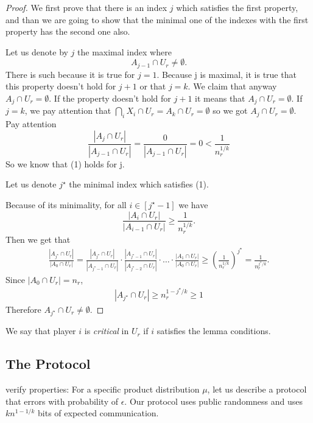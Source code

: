 \documentclass{article}
\newcommand{\TODO}[1]{ {\color{red} #1 }}
\theoremstyle{plain}
\begin{document}
\begin{proof}
    We first prove that there is an index $j$ which satisfies the first property, and than we are going to show that the minimal one of the indexes with the first property has the second one also.

  Let us denote by $j$ the maximal index where 
  \begin{equation*}
    A_{j-1} \cap U_r \neq \emptyset.
  \end{equation*}
  There is such because it is true for $j=1$. \newline
  Because j is maximal, it is true that this property doesn't hold for $j+1$ or that $j=k$. We claim that anyway $A_j  \cap U_r = \emptyset$.
  If the property doesn't hold for $j+1$ it means that $A_j \cap U_r = \emptyset$.
  If $j=k$, we pay attention that $\bigcap_i X_i  \cap U_r = A_k  \cap U_r = \emptyset$ so we got $A_j \cap U_r = \emptyset$. 
  Pay attention
  \begin{equation*}
    \frac{|A_j \cap U_r|}{|A_{j-1} \cap U_r|} = \frac{0}{|A_{j-1} \cap U_r|} = 0 < \frac{1}{n_r^{1/k}}
  \end{equation*}
  So we know that (1) holds for j.
  
  Let us denote $j^\star$ the minimal index which satisfies (1).
  
  Because of its minimality, for all $i \in [j^\star-1]$ we have
  \begin{equation*}
    \frac{|A_i \cap U_r|}{|A_{i-1} \cap U_r|} \geq \frac{1}{n_r^{1/k}}.
  \end{equation*}
  Then we get that
  \begin{align*}
    \frac{|A_{j^\star} \cap U_r|}{|A_0 \cap U_r|} = 
    \frac{|A_{j^\star} \cap U_r|}{|A_{j^\star-1} \cap U_r|} \cdot \frac{|A_{j^\star-1} \cap U_r|}{|A_{j^\star-2} \cap U_r|} \cdot \ldots \cdot \frac{|A_1 \cap U_r|}{|A_0 \cap U_r|}
    \geq
    \left(  \frac{1}{n_r^{1/k}} \right)^{j^\star}
    =
    \frac{1}{n_r^{j^\star/k}}.
  \end{align*}
  Since $|A_0 \cap U_r| = n_r$, 
  \begin{align*}
      |A_{j^\star} \cap U_r| \geq n_r^{1 - j^\star/k} \geq 1
  \end{align*}
    Therefore $A_{j^\star} \cap U_r \neq \emptyset$.
\end{proof}

We say that player $i$ is \emph{critical} in $U_r$ if $i$ satisfies the lemma conditions.

\subsection{The Protocol}
\TODO{verify properties:}
For a specific product distribution $\mu$, let us describe a protocol that errors with probability of $\epsilon$. Our protocol uses public randomness and uses $kn^{1-1/k}$ bits of expected communication.
\newline
\end{document}
